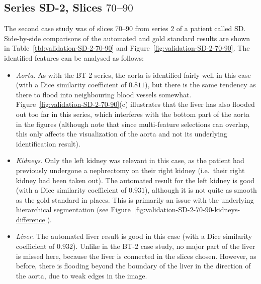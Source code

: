 \afterpage{\clearpage}
\newpage

\subsection{Series SD-2, Slices $70$--$90$}

The second case study was of slices $70$--$90$ from series $2$ of a patient called SD. Side-by-side comparisons of the automated and gold standard results are shown in Table~\ref{tbl:validation-SD-2-70-90} and Figure~\ref{fig:validation-SD-2-70-90}. The identified features can be analysed as follows:
%
\begin{itemize}

\item \emph{Aorta}. As with the BT-2 series, the aorta is identified fairly well in this case (with a Dice similarity coefficient of $0.811$), but there is the same tendency as there to flood into neighbouring blood vessels somewhat. Figure~\ref{fig:validation-SD-2-70-90}(c) illustrates that the liver has also flooded out too far in this series, which interferes with the bottom part of the aorta in the figures (although note that since multi-feature selections can overlap, this only affects the visualization of the aorta and not its underlying identification result).

\item \emph{Kidneys}. Only the left kidney was relevant in this case, as the patient had previously undergone a nephrectomy on their right kidney (i.e.~their right kidney had been taken out). The automated result for the left kidney is good (with a Dice similarity coefficient of $0.931$), although it is not quite as smooth as the gold standard in places. This is primarily an issue with the underlying hierarchical segmentation (see Figure~\ref{fig:validation-SD-2-70-90-kidneys-difference}).

\item \emph{Liver}. The automated liver result is good in this case (with a Dice similarity coefficient of $0.932$). Unlike in the BT-2 case study, no major part of the liver is missed here, because the liver is connected in the slices chosen. However, as before, there is flooding beyond the boundary of the liver in the direction of the aorta, due to weak edges in the image.


\end{itemize}
